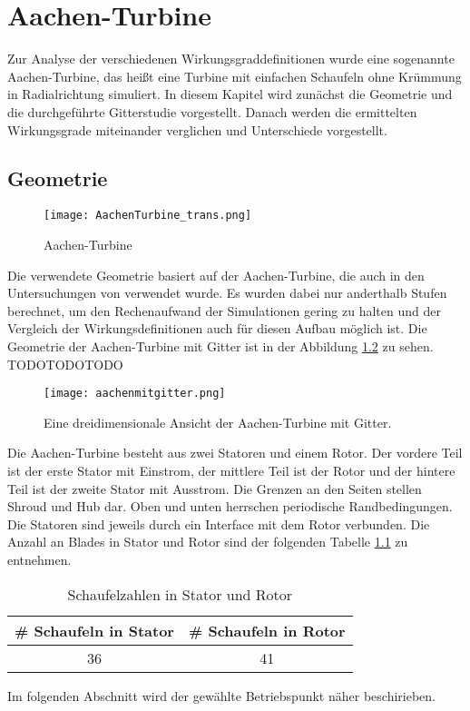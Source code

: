 \chapter{Aachen-Turbine}
\label{cha:aachen}
Zur Analyse der verschiedenen Wirkungsgraddefinitionen wurde eine sogenannte Aachen-Turbine, das heißt eine Turbine mit einfachen Schaufeln ohne Krümmung in Radialrichtung simuliert. In diesem Kapitel wird zunächst die Geometrie und die durchgeführte Gitterstudie vorgestellt. Danach werden die ermittelten Wirkungsgrade miteinander verglichen und Unterschiede vorgestellt.
\section{Geometrie}
\label{sec:aachengeo}
  \begin{figure}[htbp]
	\centering
	\label{fig:imgAachenTurbine}
	\texttt{[image: AachenTurbine\_trans.png]}
	\caption{Aachen-Turbine}
\end{figure} 
Die verwendete Geometrie basiert auf der Aachen-Turbine, die auch in den Untersuchungen von \cite{ufi2001YaoDavis} 
verwendet wurde. Es wurden dabei nur anderthalb Stufen berechnet, um den Rechenaufwand der Simulationen gering zu halten und der Vergleich der Wirkungsdefinitionen auch für diesen Aufbau möglich ist. Die Geometrie der Aachen-Turbine mit Gitter ist in der Abbildung \ref{fig:aachengebiet} zu sehen. TODOTODOTODO
\begin{figure}[H]
\texttt{[image: aachenmitgitter.png]}
\caption{Eine dreidimensionale Ansicht der Aachen-Turbine mit Gitter.}
\label{fig:aachengebiet}
\end{figure}
Die Aachen-Turbine besteht aus zwei Statoren und einem Rotor. Der vordere Teil ist der erste Stator mit Einstrom, der mittlere Teil ist der Rotor und der hintere Teil ist der zweite Stator mit Ausstrom. Die Grenzen an den Seiten stellen Shroud und Hub dar. Oben und unten herrschen periodische Randbedingungen. Die Statoren sind jeweils durch ein Interface mit dem Rotor verbunden. Die Anzahl an Blades in Stator und Rotor sind der folgenden Tabelle \ref{tab:aachenabmessungen} zu entnehmen.
\begin{table}[H]
\centering
\label{tab:aachenabmessungen}
\caption{Schaufelzahlen in Stator und Rotor}
\begin{tabular}{ c| c}
\# Schaufeln in Stator&\# Schaufeln in Rotor\\
\hline
36&41\\
\end{tabular}
\end{table}
Im folgenden Abschnitt wird der gewählte Betriebspunkt näher beschirieben.
